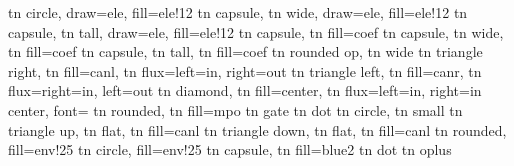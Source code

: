           {tn circle, draw=ele, fill=ele!12}
      {tn capsule, tn wide, draw=ele, fill=ele!12}
      {tn capsule, tn tall, draw=ele, fill=ele!12}
        {tn capsule, tn fill=coef}
    {tn capsule, tn wide, tn fill=coef}
    {tn capsule, tn tall, tn fill=coef}
          {tn rounded}
      {op, tn wide}
        {tn triangle right, tn fill=canl, tn flux={left=in, right=out}}
        {tn triangle left, tn fill=canr, tn flux={right=in, left=out}}
      {tn diamond, tn fill=center, tn flux={left=in, right=in}}
  {center, font=\scriptsize}
         {tn rounded, tn fill=mpo}
        {tn gate}
       {tn dot}
       {tn circle, tn small}
         {tn triangle up, tn flat, tn fill=canl}
     {tn triangle down, tn flat, tn fill=canl}
      {tn rounded, fill=env!25}
        {tn circle, fill=env!25}
      {tn capsule, tn fill=blue2}
        {tn dot}
        {tn oplus}

